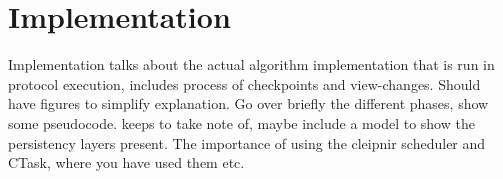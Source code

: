 \chapter{Implementation}
\label{chapter:Imp}
Implementation talks about the actual algorithm implementation that is run in protocol execution, includes process of checkpoints and view-changes. Should have figures to simplify explanation. Go over briefly the different phases, show some pseudocode. keeps to take note of, maybe include a model to show the persistency layers present. The importance of using the cleipnir scheduler and CTask, where you have used them etc.
